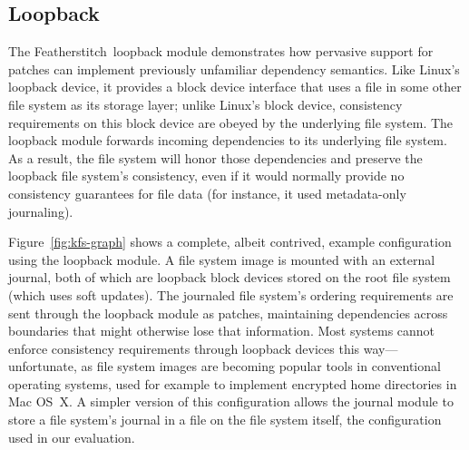 \documentclass[9pt,twocolumn,letterpaper]{article}
\newcommand{\Kudos}{Featherstitch}
\newcommand{\Featherstitch}{\Kudos}
\newcommand{\patches}{patches}
\newcommand{\modules}{modules}
\newcommand{\LFS}{L2FS}
\begin{document}
\subsection{Loopback}
\label{sec:modules:loop}

The \Featherstitch\ loopback module demonstrates how pervasive
support for patches can implement previously unfamiliar dependency
semantics.
%
Like Linux's loopback device, it provides a block device interface that
uses a file in some other file system as its storage layer; unlike Linux's
block device, consistency requirements on this block device are obeyed by
the underlying file system.
%
The loopback module forwards incoming dependencies to its underlying file
system.
%
As a result, the file system will honor those dependencies and preserve the
loopback file system's consistency, even if it would normally
provide no consistency guarantees for file data (for instance, it used
metadata-only journaling).

Figure~\ref{fig:kfs-graph} shows a complete, albeit contrived, example
configuration using the loopback module.
%
A file system image is mounted with an external journal, both of
which are loopback block devices stored on the root file system (which uses
soft updates). The journaled file system's ordering requirements are sent
through the loopback module as \patches, maintaining dependencies
across boundaries that might otherwise lose that information. 
Most systems cannot enforce consistency requirements through loopback
devices this way---unfortunate, as file system images are becoming popular
tools in  conventional operating systems, used for example to implement
encrypted home directories in Mac OS~X.
%
A simpler version of this configuration allows the journal module to
store a file system's journal in a file on the file system itself, the
configuration used in our evaluation.


\end{document}
